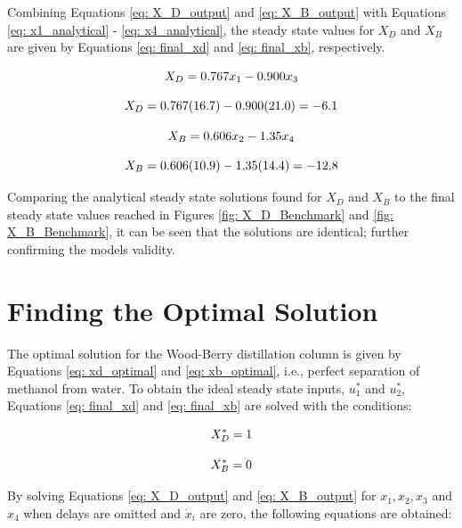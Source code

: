 Combining Equations \ref{eq: X_D_output} and \ref{eq: X_B_output} with Equations \ref{eq: x1_analytical} - \ref{eq: x4_analytical}, the steady state values for $X_D$ and $X_B$ are given by Equations \ref{eq: final_xd} and \ref{eq: final_xb}, respectively.

{
\begin{equation}
    \centering
    X_D = 0.767x_1 - 0.900x_3
\end{equation}

\begin{equation}
    \centering
    X_D = 0.767(16.7) - 0.900(21.0) = -6.1
    \label{eq: final_xd}
\end{equation}

\begin{equation}
    \centering
    X_B = 0.606x_2 - 1.35x_4
\end{equation}

\begin{equation}
    \centering
    X_B = 0.606(10.9) - 1.35(14.4) = -12.8
    \label{eq: final_xb}
\end{equation}
}

Comparing the analytical steady state solutions found for $X_D$ and $X_B$ to the final steady state values reached in Figures \ref{fig: X_D_Benchmark} and \ref{fig: X_B_Benchmark}, it can be seen that the solutions are identical; further confirming the models validity.

\section{Finding the Optimal Solution}

The optimal solution for the Wood-Berry distillation column is given by Equations \ref{eq: xd_optimal} and \ref{eq: xb_optimal}, i.e., perfect separation of methanol from water. To obtain the ideal steady state inputs, $u_1^*$ and $u_2^*$, Equations \ref{eq: final_xd} and \ref{eq: final_xb} are solved with the conditions:

{
\begin{equation}
    \centering
    X_D^* = 1
    \label{eq: xd_optimal}
\end{equation}

\begin{equation}
    \centering
    X_B^* = 0
    \label{eq: xb_optimal}
\end{equation}
}

By solving Equations \ref{eq: X_D_output} and \ref{eq: X_B_output} for $x_1, x_2, x_3$ and $x_4$ when delays are omitted and $\dot{x}_i$ are zero, the following equations are obtained: \\

